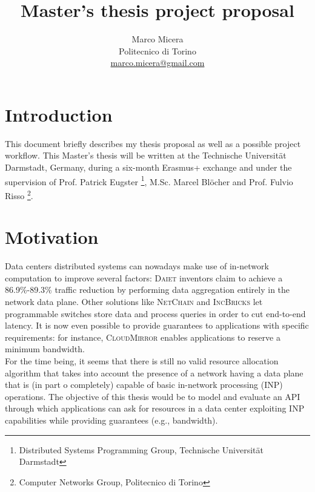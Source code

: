 \documentclass[letterpaper,twocolumn,10pt]{article}
\begin{document}
\title{Master's thesis project proposal}

\date{}

\author{
{   \rm Marco Micera}\\
    Politecnico di Torino\\
    \href{mailto:marco.micera@gmail.com}{marco.micera@gmail.com}
}
\maketitle

\section*{Introduction}
This document briefly describes my thesis proposal as well as a possible project workflow. This Master's thesis will be written at the Technische Universit{\"a}t Darmstadt, Germany, during a six-month Erasmus+ exchange and under the supervision of Prof. Patrick Eugster \footnote[2]{\label{tuda} Distributed Systems Programming Group, Technische Universit{\"a}t Darmstadt}, M.Sc. Marcel Bl{\"o}cher  and Prof. Fulvio Risso \footnote[3]{\label{polito} Computer Networks Group, Politecnico di Torino}.

\section{Motivation} \label{motivation}
Data centers distributed systems can nowadays make use of in-network computation to improve several factors: \textsc{Daiet} \cite{daiet} inventors claim to achieve a 86.9\%-89.3\% traffic reduction by performing data aggregation entirely in the network data plane. Other solutions like \textsc{NetChain} \cite{netchain} and \textsc{IncBricks} \cite{incbricks} let programmable switches store data and process queries in order to cut end-to-end latency. It is now even possible to provide guarantees to applications with specific requirements: for instance, \textsc{CloudMirror} \cite{cloudmirror} enables applications to reserve a minimum bandwidth.\\ For the time being, it seems that there is still no valid resource allocation algorithm that takes into account the presence of a network having a data plane that is (in part o completely) capable of basic in-network processing (INP) operations. The objective of this thesis would be to model and evaluate an API through which applications can ask for resources in a data center exploiting INP capabilities while providing guarantees (e.g., bandwidth).
\end{document}
